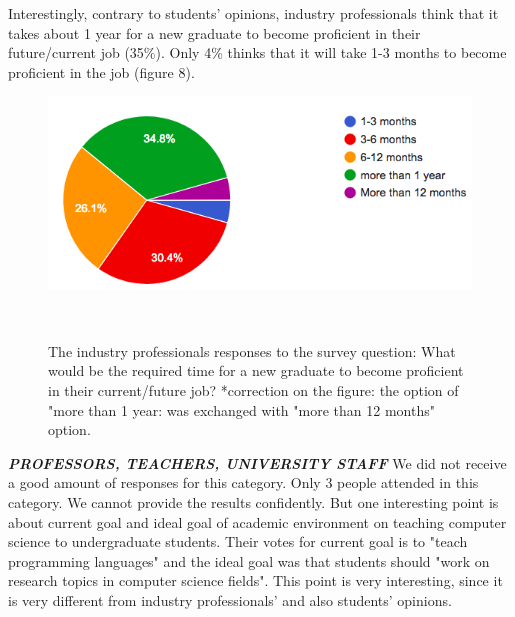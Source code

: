 \documentclass{sigchi}
\begin{document}
Interestingly, contrary to students' opinions, industry professionals think that it takes about 1 year for a new graduate to become proficient in their future/current job (35\%). Only 4\% thinks that it will take 1-3 months to become proficient in the job (figure 8).

\begin{figure}
\centering
  \includegraphics[width=1.05\columnwidth]{figures/time_proficiency_i}
  \caption{The industry professionals responses to the survey question: What would be the required time for a new graduate to become proficient in their current/future job? *correction on the figure: the option of "more than 1 year: was exchanged with "more than 12 months" option.}~\label{fig:figure8}
\end{figure}

\textit{\textbf{PROFESSORS, TEACHERS, UNIVERSITY STAFF}}\newline
We did not receive a good amount of responses for this category. Only 3 people attended in this category. We cannot provide the results confidently. But one interesting point is about current goal and ideal goal of academic environment on teaching computer science to undergraduate students. Their votes for current goal is to "teach programming languages" and the ideal goal was that students should "work on research topics in computer science fields". This point is very interesting, since it is very different from industry professionals' and also students' opinions.
\end{document}
